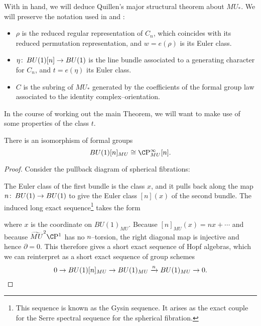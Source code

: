 With  in hand, we will deduce Quillen's major structural theorem about $MU_*$.  We will preserve the notation used in  and :
\begin{itemize}
\item $\rho$ is the reduced regular representation of $C_n$, which coincides with its reduced permutation representation, and $w = e(\rho)$ is its Euler class.
\item $\eta\colon\thinspace BU(1)[n] \to BU(1)$ is the line bundle associated to a generating character for $C_n$, and $t = e(\eta)$ its Euler class.
\item $C$ is the subring of $MU_*$ generated by the coefficients of the formal group law associated to the identity complex--orientation.
\end{itemize}
In the course of working out the main Theorem, we will want to make use of some properties of the class $t$.

\begin{lemma}\label{MUConvertsTorsionPointsToTorsionPoints}
There is an isomorphism of formal groups \[BU(1)[n]_{MU} \cong \CP^\infty_{MU}[n].\]
\end{lemma}
\begin{proof}
Consider the pullback diagram of spherical fibrations:
\begin{center}
\end{center}
The Euler class of the first bundle is the class $x$, and it pulls back along the map $n\colon\thinspace BU(1) \to BU(1)$ to give the Euler class $[n](x)$ of the second bundle.  The induced long exact sequence\footnote{This sequence is known as the Gysin sequence.  It arises as the exact couple for the Serre spectral sequence for the spherical fibration.} takes the form
\begin{center}
\end{center}
where $x$ is the coordinate on $BU(1)_{MU}$.  Because $[n]_{MU}(x) = nx + \cdots$ and because $\widetilde{MU}^2 \CP^1$ has no $n$--torsion, the right diagonal map is injective and hence $\partial = 0$.  This therefore gives a short exact sequence of Hopf algebras, which we can reinterpret as a short exact sequence of group schemes \[0 \to BU(1)[n]_{MU} \to BU(1)_{MU} \xrightarrow{n} BU(1)_{MU} \to 0. \qedhere\]
\end{proof}

